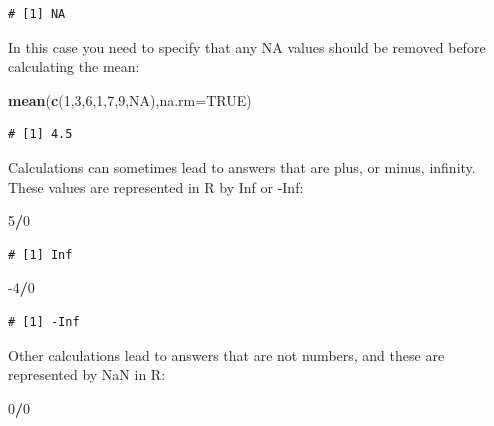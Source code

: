 \documentclass[
  a4paperpaper,
]{book}
\newenvironment{Shaded}{\begin{snugshade}}{\end{snugshade}}
\newcommand{\DataTypeTok}[1]{\textcolor[rgb]{0.13,0.29,0.53}{#1}}
\newcommand{\DecValTok}[1]{\textcolor[rgb]{0.00,0.00,0.81}{#1}}
\newcommand{\KeywordTok}[1]{\textcolor[rgb]{0.13,0.29,0.53}{\textbf{#1}}}
\newcommand{\NormalTok}[1]{#1}
\newcommand{\OperatorTok}[1]{\textcolor[rgb]{0.81,0.36,0.00}{\textbf{#1}}}
\newcommand{\OtherTok}[1]{\textcolor[rgb]{0.56,0.35,0.01}{#1}}
\begin{document}
\begin{verbatim}
# [1] NA
\end{verbatim}

In this case you need to specify that any NA values should be removed before calculating the mean:

\begin{Shaded}
\begin{Highlighting}[]
\KeywordTok{mean}\NormalTok{(}\KeywordTok{c}\NormalTok{(}\DecValTok{1}\NormalTok{,}\DecValTok{3}\NormalTok{,}\DecValTok{6}\NormalTok{,}\DecValTok{1}\NormalTok{,}\DecValTok{7}\NormalTok{,}\DecValTok{9}\NormalTok{,}\OtherTok{NA}\NormalTok{),}\DataTypeTok{na.rm=}\OtherTok{TRUE}\NormalTok{)}
\end{Highlighting}
\end{Shaded}

\begin{verbatim}
# [1] 4.5
\end{verbatim}

Calculations can sometimes lead to answers that are plus, or minus, infinity. These values are represented in R by Inf or -Inf:

\begin{Shaded}
\begin{Highlighting}[]
\DecValTok{5}\OperatorTok{/}\DecValTok{0}
\end{Highlighting}
\end{Shaded}

\begin{verbatim}
# [1] Inf
\end{verbatim}

\begin{Shaded}
\begin{Highlighting}[]
\DecValTok{{-}4}\OperatorTok{/}\DecValTok{0}
\end{Highlighting}
\end{Shaded}

\begin{verbatim}
# [1] -Inf
\end{verbatim}

Other calculations lead to answers that are not numbers, and these are represented by NaN in R:

\begin{Shaded}
\begin{Highlighting}[]
\DecValTok{0}\OperatorTok{/}\DecValTok{0}
\end{Highlighting}
\end{Shaded}
\end{document}
